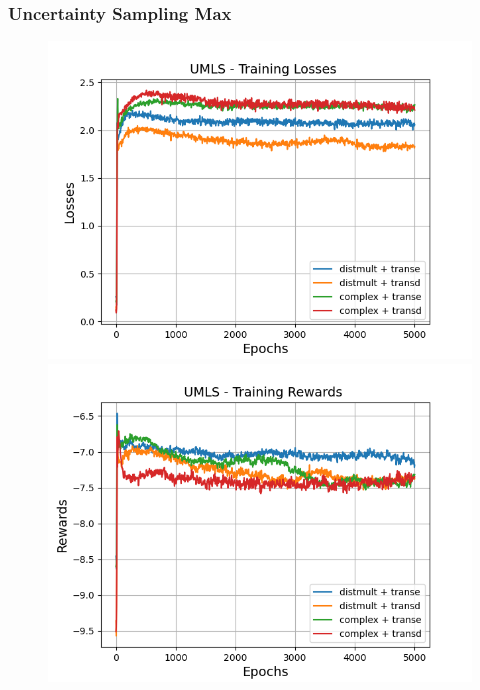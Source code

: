 \subsubsection{Uncertainty Sampling Max}


\begin{figure}
    \centering
    \begin{minipage}{.5\textwidth}
      \centering
      \includegraphics[width=0.9\linewidth]{figures/results/gan_train/pretrained/uncertainty/max/entropy/umls/gan_train_uncertainty_umls_losses.png}
    \end{minipage}%
    \begin{minipage}{.5\textwidth}
      \centering
      \includegraphics[width=0.9\linewidth]{figures/results/gan_train/pretrained/uncertainty/max/entropy/umls/gan_train_uncertainty_umls_rewards.png}
    \end{minipage}

\end{figure}
